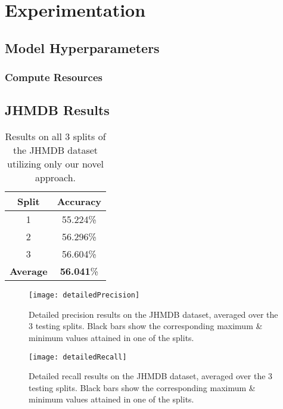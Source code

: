 
\chapter{Experimentation} %

\label{Experimentation} %

\section{Model Hyperparameters}

\subsection{Compute Resources}

\section{JHMDB Results}

\begin{table}[h]
	\centering
	\begin{tabular}{||c c||} 
		\hline
		\textbf{Split} & \textbf{Accuracy} \\ [0.5ex] 
		\hline\hline
		1 & 55.224\% \\ 
		\hline
		2 & 56.296\% \\
		\hline
		3 & 56.604\% \\
		\hline
		\hline
		\textbf{Average} & \textbf{56.041}\% \\
		\hline
	\end{tabular}
	\label{tab:acc-results}
	\caption{Results on all 3 splits of the JHMDB dataset utilizing only our novel approach.}
\end{table}

\begin{figure}[h]
	\texttt{[image: detailedPrecision]}
	\centering
	\caption{Detailed precision results on the JHMDB dataset, averaged over the 3 testing splits. Black bars show the corresponding maximum \& minimum values attained in one of the splits.}
	\label{fig:detailed-precision}
\end{figure}

\begin{figure}[h]
	\texttt{[image: detailedRecall]}
	\centering
	\caption{Detailed recall results on the JHMDB dataset, averaged over the 3 testing splits. Black bars show the corresponding maximum \& minimum values attained in one of the splits.}
	\label{fig:detailed-recall}
\end{figure}

